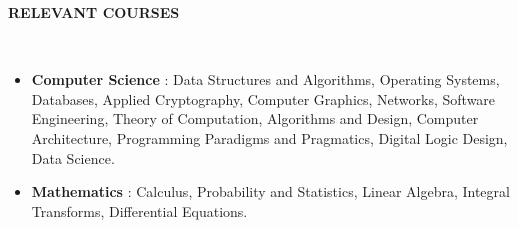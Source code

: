 \documentclass[a4paper,10pt]{article}
\newcommand{\lsep}{-0.6cm}
\newcommand{\resheading}[1]{{\small \colorbox{mygrey}{\begin{minipage}{0.975\textwidth}{\textbf{#1 \vphantom{p\^{E}}}}\end{minipage}}}}
\begin{document}
\resheading{\textbf{RELEVANT COURSES} }\\[\lsep]
\vspace{1.0pt}
\begin{itemize}[itemsep=0.1pt]
\item \noindent \textbf{Computer Science} : Data Structures and Algorithms, Operating Systems, Databases, Applied Cryptography, Computer Graphics, Networks, Software Engineering, Theory of Computation,  Algorithms and Design, Computer Architecture,
Programming Paradigms and Pragmatics, Digital Logic Design, Data Science.
\item \noindent \textbf{Mathematics} : Calculus, Probability and Statistics, Linear Algebra, Integral Transforms, Differential Equations.
\end{itemize}
\end{document}
